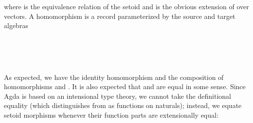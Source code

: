 \noindent where \AgdaUnderscore{}\AgdaUnderscore{} is the equivalence relation of the setoid
  and   is the obvious extension of  over vectors.
A homomorphism is a record parameterized by the source and target algebras

\begin{code}
\>[2]\AgdaSpace{}%
\AgdaSpace{}%
\AgdaSymbol{\{}\AgdaSymbol{\}}\AgdaSpace{}%
\AgdaSymbol{(}\AgdaSpace{}
\AgdaSpace{}\AgdaSymbol{:}\AgdaSpace{}\AgdaSpace{}\AgdaSymbol{)}\AgdaSpace{}%
\AgdaSymbol{:}\AgdaSpace{}%
\AgdaSpace{}%
\<%
\\
\>[2][@{}l@{\AgdaIndent{0}}]%
\>[4]\<%
\\
\>[4][@{}l@{\AgdaIndent{0}}]%
\>[6]%
\>[13]\AgdaSymbol{:}\AgdaSpace{}%
\<%
\\
%
\>[6]%
\>[12]\AgdaSymbol{:}\AgdaSpace{}%
\AgdaSpace{}%
\AgdaSpace{}\<%
\end{code}


\noindent As expected, we have the identity homomorphism
\AgdaSpace{}\AgdaSpace\AgdaSymbol{:}
\AgdaSpace{}\AgdaSpace{} and
the composition \AgdaSpace{}\AgdaSpace{}\AgdaSpace{}
\AgdaSymbol{:}\AgdaSpace{}
\AgdaSpace{}\AgdaSpace{} of homomorphisms
\AgdaSpace{}\AgdaSymbol{:}\AgdaSpace{}
\AgdaSpace{}\AgdaSpace{}
and
\AgdaSpace{}\AgdaSymbol{:}\AgdaSpace{}
\AgdaSpace{}\AgdaSpace{}.
It is also expected that
\AgdaSpace{}\AgdaSpace{}
\AgdaSpace{}\AgdaSpace and
  are
equal in some sense. Since Agda is based on an
intensional type theory, we cannot take the definitional equality
(which distinguishes  from     \AgdaFunction{+}  as functions
on naturals); instead, we equate setoid morphisms 
whenever their function parts are extensionally equal:



